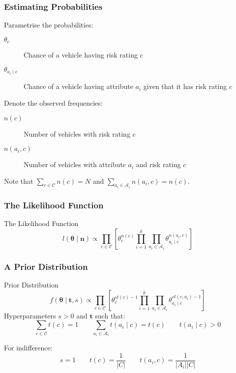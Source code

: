 \documentclass{beamer}
\begin{document}
\begin{frame}
	\frametitle{Estimating Probabilities}
	Parametrise the probabilities:
	\begin{description}
		\item[$\theta_c$] Chance of a vehicle having risk rating $c$
		\item[$\theta_{a_i \mid c}$] Chance of a vehicle having attribute $a_i$ given that it has risk rating $c$
	\end{description}\vspace{0.5em}

	Denote the observed frequencies:
	\begin{description}
		\item[$n(c)$] Number of vehicles with risk rating $c$
		\item[$n(a_i, c)$] Number of vehicles with attribute $a_i$ and risk rating $c$
	\end{description}
	Note that $\sum_{c \in \mathcal{C}}n(c) = N$ and $\sum_{a_i \in \mathcal{A}_i}n(a_i, c) = n(c)$.
\end{frame}

\begin{frame}
	\frametitle{The Likelihood Function}
	\begin{block}{The Likelihood Function}
		\begin{equation}\label{likelihood function}
			l(\mathbf{\theta} \mid \mathbf{n}) \propto \prod_{c \in \mathcal{C}} \left[ \theta_c^{n(c)} \prod_{i=1}^k \prod_{a_i \in \mathcal{A}_i} \theta_{a_i \mid c}^{n(a_i, c)} \right]
		\end{equation}
	\end{block}
\end{frame}

\begin{frame}
	\frametitle{A Prior Distribution}
	\begin{block}{Prior Distribution}
		\begin{equation}
			f(\mathbf{\theta} \mid \mathbf{t}, s) \propto \prod_{c \in \mathcal{C}} \left[ \theta_c^{st(c) - 1} \prod_{i=1}^k \prod_{a_i \in \mathcal{A}_i} \theta_{a_i \mid c}^{st(c, a_i) - 1} \right]
		\end{equation}
		Hyperparameters $s>0$ and $\mathbf{t}$ such that:
		\begin{equation}
			\sum_{c \in \mathcal{C}} t(c) = 1 \qquad \sum_{a_i \in \mathcal{A}_i} t(a_i \mid c) = t(c) \qquad t(a_i \mid c) > 0
		\end{equation}
	\end{block}
	For indifference:
	\begin{equation}
		s = 1 \qquad t(c) = \frac{1}{|C|} \qquad t(a_i, c) = \frac{1}{|A_i||C|}
	\end{equation}
\end{frame}
\end{document}
